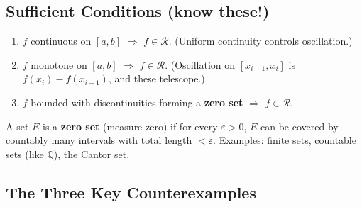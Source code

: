 \documentclass[11pt]{article}
\newcommand{\Q}{\mathbb{Q}}
\newcommand{\eps}{\varepsilon}
\theoremstyle{definition}
\begin{document}
\subsection{Sufficient Conditions (know these!)}

\begin{enumerate}
\item $f$ continuous on $[a,b]$ $\Rightarrow$ $f \in \mathscr{R}$. (Uniform continuity controls oscillation.)
\item $f$ monotone on $[a,b]$ $\Rightarrow$ $f \in \mathscr{R}$. (Oscillation on $[x_{i-1}, x_i]$ is $f(x_i) - f(x_{i-1})$, and these telescope.)
\item $f$ bounded with discontinuities forming a \textbf{zero set} $\Rightarrow$ $f \in \mathscr{R}$.
\end{enumerate}

A set $E$ is a \textbf{zero set} (measure zero) if for every $\eps > 0$, $E$ can be covered by countably many intervals with total length $< \eps$. Examples: finite sets, countable sets (like $\Q$), the Cantor set.

\subsection{The Three Key Counterexamples}
\end{document}
